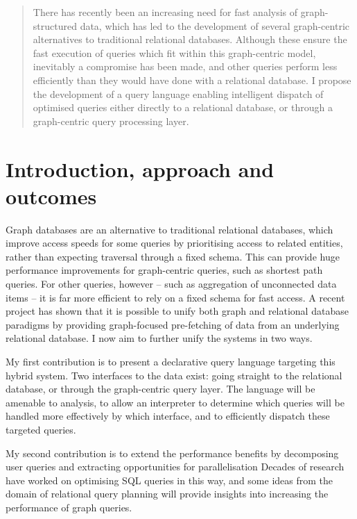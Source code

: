 \documentclass[11pt]{article}
\begin{document}
\begin{abstract}


There has recently been an increasing need for fast analysis of 
graph-structured data, which has led to the development of several graph-centric
alternatives to traditional relational databases. Although these ensure the
fast execution of queries which fit within this graph-centric model,
inevitably a compromise has been made, and other queries perform less
efficiently than they would have done with a relational database. I propose
the development of a query language enabling intelligent dispatch of optimised
queries either directly to a relational database, or through a graph-centric query processing
layer.

\end{abstract}

\section{Introduction, approach and outcomes}

Graph databases are an alternative to traditional relational databases,
which improve access speeds for some queries by prioritising access to related
entities, rather than expecting traversal through a fixed schema. This can
provide huge performance improvements for graph-centric queries, such as 
shortest path queries. For other queries, however -- such as aggregation of 
unconnected data items -- it is far more efficient to rely on a
 fixed schema for fast access. A recent project\cite{crackle} has shown that it
is possible to unify both graph and relational database paradigms by providing
graph-focused pre-fetching of data from an underlying relational database. 
I now aim to further unify the systems in two ways.

My first contribution is to present a declarative query language 
targeting this hybrid system. Two interfaces to the data exist: going
straight to the relational database, or through the graph-centric query
layer. The language will be amenable to analysis, to
allow an interpreter to determine which queries will be 
handled more effectively by which interface, and to efficiently 
dispatch these targeted queries.

My second contribution is to extend the performance benefits
by decomposing
user queries and extracting opportunities for parallelisation
Decades of research have worked on
optimising SQL queries in this way, and some ideas from the domain of relational
query planning will provide insights into increasing the performance of graph
queries.
\end{document}

